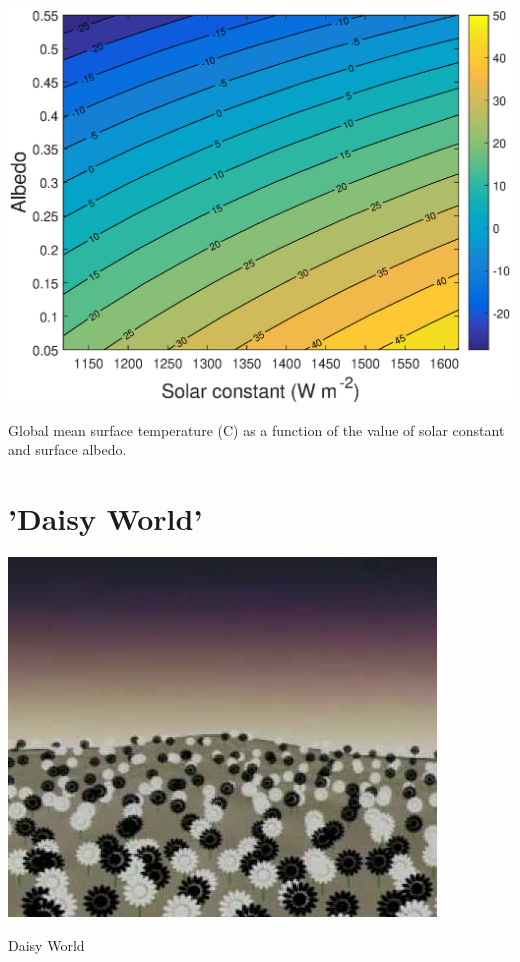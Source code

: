 \documentclass{tufte-book} %
\begin{document}
\begin{marginfigure}[0.0in]
\includegraphics[width=\linewidth]{ch8-sens2D2.eps}
\caption{Global mean surface temperature (\degree C) as a function of the value of solar constant and surface albedo.}
\label{fig:ch8-sens2D1}
\end{marginfigure}


\newpage


\section{'Daisy World'}

\begin{marginfigure}[0.5in]
\includegraphics[width=\linewidth]{ch8-daisyworld.png}
\caption{Daisy World}
\label{fig:ch8-daisyworld}
\end{marginfigure}
\end{document}
